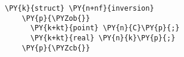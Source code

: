 \begin{Verbatim}[commandchars=\\\{\}]
    \PY{k}{struct} \PY{n+nf}{inversion}
    \PY{p}{\PYZob{}}
      \PY{k+kt}{point} \PY{n}{C}\PY{p}{;}
      \PY{k+kt}{real} \PY{n}{k}\PY{p}{;}
    \PY{p}{\PYZcb{}}
\end{Verbatim}

